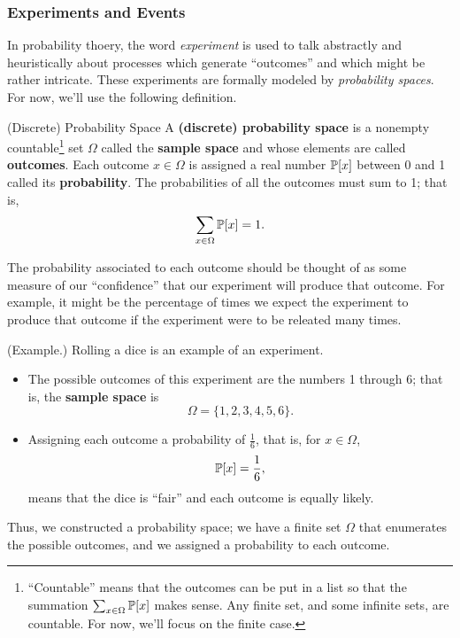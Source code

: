 \documentclass[letterpaper]{article}
\newcommand{\0}{\mathbf{0}}
\begin{document}
\subsubsection{Experiments and Events}
In probability thoery, the word \emph{experiment} is used to talk abstractly and heuristically about processes which generate ``outcomes'' and which might be rather intricate. These experiments are formally modeled by \emph{probability spaces}. For now, we'll use the following definition. 
\begin{definition}{(Discrete) Probability Space}{}
    A \textbf{(discrete) probability space} is a nonempty countable\footnote{``Countable'' means that the outcomes can be put in a list so that the summation $\sum_{x \in \Omega} \mathbb{P}[x]$ makes sense. Any finite set, and some infinite sets, are countable. For now, we'll focus on the finite case.} set $\Omega$ called the \textbf{sample space} and whose elements are called \textbf{outcomes}. Each outcome $x \in \Omega$ is assigned a real number $\mathbb{P}[x]$ between 0 and 1 called its \textbf{probability}. The probabilities of all the outcomes must sum to 1; that is, 
    \[\sum_{x \in \Omega} \mathbb{P}[x] = 1.\]
\end{definition}
The probability associated to each outcome should be thought of as some measure of our ``confidence'' that our experiment will produce that outcome. For example, it might be the percentage of times we expect the experiment to produce that outcome if the experiment were to be releated many times. 

\begin{mdframed}
    (Example.) Rolling a dice is an example of an experiment. 
    \begin{itemize}
        \item The possible outcomes of this experiment are the numbers 1 through 6; that is, the \textbf{sample space} is \[\Omega = \{1, 2, 3, 4, 5, 6\}.\] 
        \item Assigning each outcome a probability of $\frac{1}{6}$, that is, for $x \in \Omega$, \[\mathbb{P}[x] = \frac{1}{6},\] means that the dice is ``fair'' and each outcome is equally likely. 
    \end{itemize}
    Thus, we constructed a probability space; we have a finite set $\Omega$ that enumerates the possible outcomes, and we assigned a probability to each outcome. 
\end{mdframed}
\end{document}

